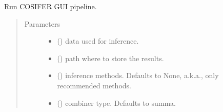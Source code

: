 \documentclass[letterpaper,10pt,english]{sphinxmanual}
\begin{document}
\begin{fulllineitems}
\label{\detokenize{_modules/cosifer.pipelines:cosifer.pipelines.pipeline_gui.run}}
Run COSIFER GUI pipeline.
\begin{quote}\begin{description}
\item[{Parameters}] \leavevmode\begin{itemize}
\item {} 
 () \textendash{} data used for inference.

\item {} 
 () \textendash{} path where to store the results.

\item {} 
 (\sphinxstyleliteralemphasis{\sphinxupquote{, }}) \textendash{} inference methods. Defaults to None, a.k.a.,
only recommended methods.

\item {} 
 (\sphinxstyleliteralemphasis{\sphinxupquote{, }}) \textendash{} combiner type. Defaults to summa.

\end{itemize}

\end{description}\end{quote}

\end{fulllineitems}

\end{document}
